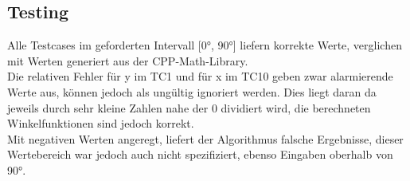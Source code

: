 \documentclass{article}
\newcommand{\bild}[3]{
\begin{center}			\texttt{[image: \#1]}			
		\end{center}	
}
\begin{document}
\subsection{Testing}
	Alle Testcases im geforderten Intervall [0°, 90°] liefern korrekte Werte, verglichen mit Werten generiert aus der CPP-Math-Library. \\
	Die relativen Fehler für y im TC1 und für x im TC10 geben zwar alarmierende Werte aus, können jedoch als ungültig ignoriert werden. Dies liegt daran da jeweils durch sehr kleine Zahlen nahe der 0 dividiert wird, die berechneten Winkelfunktionen sind jedoch korrekt. \\
	Mit negativen Werten angeregt, liefert der Algorithmus falsche Ergebnisse, dieser Wertebereich war jedoch auch nicht spezifiziert, ebenso Eingaben oberhalb von 90°.
\end{document}

